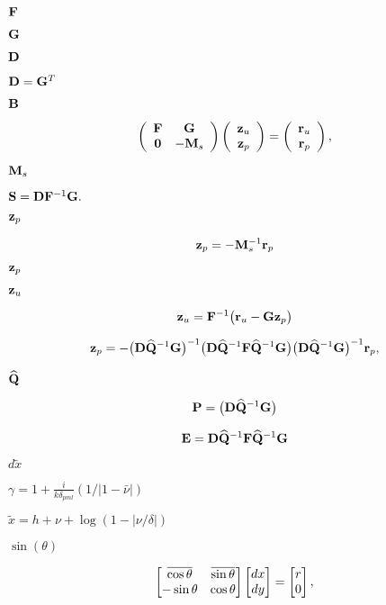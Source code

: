 \documentclass{article}
\begin{document}
$ {\bf F}$
\pagebreak

$ {\bf G} $
\pagebreak

$ {\bf D}$
\pagebreak

$ {\bf D} = {\bf G}^T $
\pagebreak

$ {\bf B} $
\pagebreak

\[ \left( \begin{array}{cc} {\bf F} & {\bf G} \\ {\bf 0} & -{\bf M}_s \end{array} \right) \left( \begin{array}{c} {\bf z}_u \\ {\bf z}_p \end{array} \right) = \left( \begin{array}{c} {\bf r}_u \\ {\bf r}_p \end{array} \right), \]
\pagebreak

${\bf M}_s$
\pagebreak

$ {\bf S} = {\bf D} {\bf F}^{-1}{\bf G}. $
\pagebreak

$ {\bf z}_p$
\pagebreak

\[ {\bf z}_p = - {\bf M}_s^{-1} {\bf r}_p \]
\pagebreak

$ {\bf z}_p $
\pagebreak

$ {\bf z}_u$
\pagebreak

\[ {\bf z}_u = {\bf F}^{-1} \big( {\bf r}_u - {\bf G} {\bf z}_p \big) \]
\pagebreak

\[ {\bf z}_p = - \big({\bf D} \widehat{\bf Q}^{-1}{\bf G} \big)^{-1} \big({\bf D} \widehat{\bf Q}^{-1}{\bf F} \widehat{\bf Q}^{-1}{\bf G}\big) \big({\bf D} \widehat{\bf Q}^{-1}{\bf G} \big)^{-1} {\bf r}_p, \]
\pagebreak

$ \widehat{\bf Q} $
\pagebreak

\[ {\bf P} = \big({\bf D} \widehat{\bf Q}^{-1}{\bf G} \big) \]
\pagebreak

\[ {\bf E}={\bf D}\widehat{\bf Q}^{-1}{\bf F}\widehat{\bf Q}^{-1}{\bf G} \]
\pagebreak

$d\tilde x $
\pagebreak

$\gamma = 1 + \frac i {k\delta_{pml}}(1/|1-\bar\nu|)$
\pagebreak

$\tilde x = h + \nu + \log(1-|\nu / \delta|)$
\pagebreak

$ \sin(\theta) $
\pagebreak

\[ \begin{bmatrix} \overline{\cos\theta} & \overline{\sin\theta} \cr -\sin\theta & \cos\theta \end{bmatrix} \begin{bmatrix} dx \\ dy \end{bmatrix} = \begin{bmatrix} r \\ 0 \end{bmatrix}, \]
\pagebreak
\end{document}
